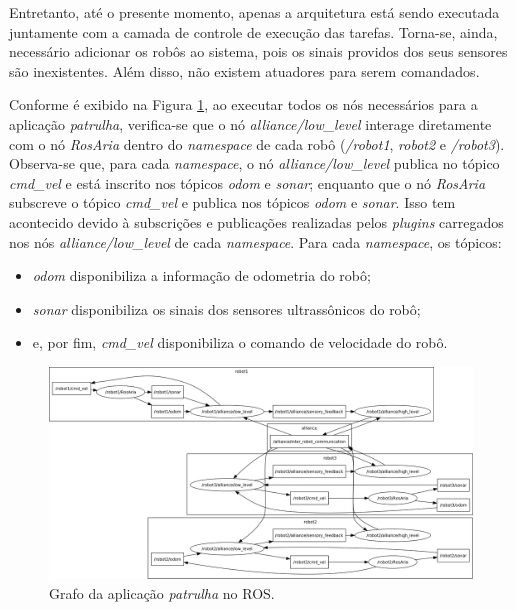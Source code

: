             Entretanto, até o presente momento, apenas a arquitetura está sendo executada juntamente com a camada de controle de execução das tarefas. Torna-se, ainda, necessário adicionar os robôs ao sistema, pois os sinais providos dos seus sensores são inexistentes. Além disso, não existem atuadores para serem comandados.
            
            Conforme é exibido na Figura \ref{fig:patrulha_rosgraph}, ao executar todos os nós necessários para a aplicação \textit{patrulha}, verifica-se que o nó \textit{alliance/low\_level} interage diretamente com o nó \textit{RosAria} dentro do \textit{namespace} de cada robô (\textit{/robot1}, \textit{robot2} e \textit{/robot3}). Observa-se que, para cada \textit{namespace}, o nó \textit{alliance/low\_level} publica no tópico \textit{cmd\_vel} e está inscrito nos tópicos \textit{odom} e \textit{sonar}; enquanto que o nó \textit{RosAria} subscreve o tópico \textit{cmd\_vel} e publica nos tópicos \textit{odom} e \textit{sonar}. Isso tem acontecido devido à subscrições e publicações realizadas pelos \textit{plugins} carregados nos nós \textit{alliance/low\_level} de cada \textit{namespace}. Para cada \textit{namespace}, os tópicos:
            
            \begin{itemize}
                \item \textit{odom} disponibiliza a informação de odometria do robô;
                
                \item \textit{sonar} disponibiliza os sinais dos sensores ultrassônicos do robô;
                
                \item e, por fim, \textit{cmd\_vel} disponibiliza o comando de velocidade do robô.
            \end{itemize}
        
            \begin{figure}[p]
                \centering
                \includegraphics[width=.95\textheight,angle=90]{Figuras/4_resultados/patrulha_rosgraph.png}
                \caption{Grafo da aplicação \textit{patrulha} no ROS.} \label{fig:patrulha_rosgraph}
            \end{figure}
            
